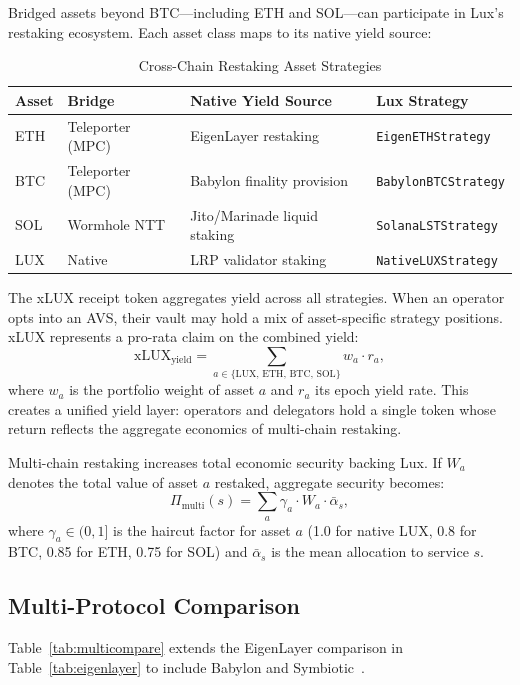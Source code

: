 \documentclass[11pt]{article}
\begin{document}
Bridged assets beyond BTC---including ETH and SOL---can participate in Lux's restaking
ecosystem.  Each asset class maps to its native yield source:

\begin{table}[H]
\centering
\caption{Cross-Chain Restaking Asset Strategies}
\label{tab:crosschain}
\begin{tabular}{llll}
\toprule
\textbf{Asset} & \textbf{Bridge} & \textbf{Native Yield Source} & \textbf{Lux Strategy} \\
\midrule
ETH   & Teleporter (MPC) & EigenLayer restaking & \texttt{EigenETHStrategy} \\
BTC   & Teleporter (MPC) & Babylon finality provision & \texttt{BabylonBTCStrategy} \\
SOL   & Wormhole NTT     & Jito/Marinade liquid staking & \texttt{SolanaLSTStrategy} \\
LUX   & Native           & LRP validator staking & \texttt{NativeLUXStrategy} \\
\bottomrule
\end{tabular}
\end{table}

The xLUX receipt token aggregates yield across all strategies.  When an operator opts into
an AVS, their vault may hold a mix of asset-specific strategy positions.  xLUX
represents a pro-rata claim on the combined yield:
\[
  \text{xLUX}_{\text{yield}} = \sum_{a \in \{\text{LUX, ETH, BTC, SOL}\}}
    w_a \cdot r_a,
\]
where $w_a$ is the portfolio weight of asset $a$ and $r_a$ its epoch yield rate.  This
creates a unified yield layer: operators and delegators hold a single token whose return
reflects the aggregate economics of multi-chain restaking.

Multi-chain restaking increases total economic security backing Lux.  If $W_a$ denotes the
total value of asset $a$ restaked, aggregate security becomes:
\[
  \Pi_{\text{multi}}(s) = \sum_{a} \gamma_a \cdot W_a \cdot \bar{\alpha}_s,
\]
where $\gamma_a \in (0,1]$ is the haircut factor for asset $a$ (1.0 for native LUX,
0.8 for BTC, 0.85 for ETH, 0.75 for SOL) and $\bar{\alpha}_s$ is the mean allocation
to service $s$.

\subsection{Multi-Protocol Comparison}
\label{sec:multicomparison}

Table~\ref{tab:multicompare} extends the EigenLayer comparison in
Table~\ref{tab:eigenlayer} to include Babylon and Symbiotic~\cite{symbiotic2024protocol}.
\end{document}
